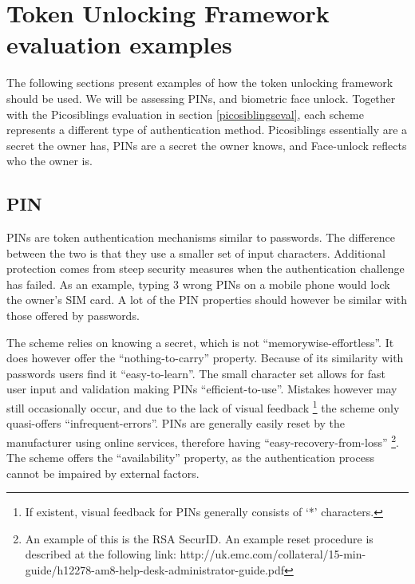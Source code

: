 
\chapter{Token Unlocking Framework evaluation examples} %

\label{AppendixA} %


The following sections present examples of how the token unlocking framework should be used. We will be assessing PINs, and biometric face unlock. Together with the Picosiblings evaluation in section \ref{picosiblingseval}, each scheme represents a different type of authentication method. Picosiblings essentially are a secret the owner has, PINs are a secret the owner knows, and Face-unlock reflects who the owner is. 

%
%
\section*{PIN}
PINs are token authentication mechanisms similar to passwords. The difference between the two is that they use a smaller set of input characters. Additional protection comes from steep security measures when the authentication challenge has failed. As an example, typing 3 wrong PINs on a mobile phone would lock the owner's SIM card. A lot of the PIN properties should however be similar with those offered by passwords.
	
The scheme relies on knowing a secret, which is not ``memorywise-effortless''. It does however offer the ``nothing-to-carry'' property. Because of its similarity with passwords users find it ``easy-to-learn''. The small character set allows for fast user input and validation making PINs ``efficient-to-use''. Mistakes however may still occasionally occur, and due to the lack of visual feedback \footnote{If existent, visual feedback for PINs generally consists of `*' characters.} the scheme only quasi-offers ``infrequent-errors''. PINs are generally easily reset by the manufacturer using online services, therefore having ``easy-recovery-from-loss'' \footnote{An example of this is the RSA SecurID. An example reset procedure is described at the following link: http://uk.emc.com/collateral/15-min-guide/h12278-am8-help-desk-administrator-guide.pdf}. The scheme offers the ``availability'' property, as the authentication process cannot be impaired by external factors.
	
